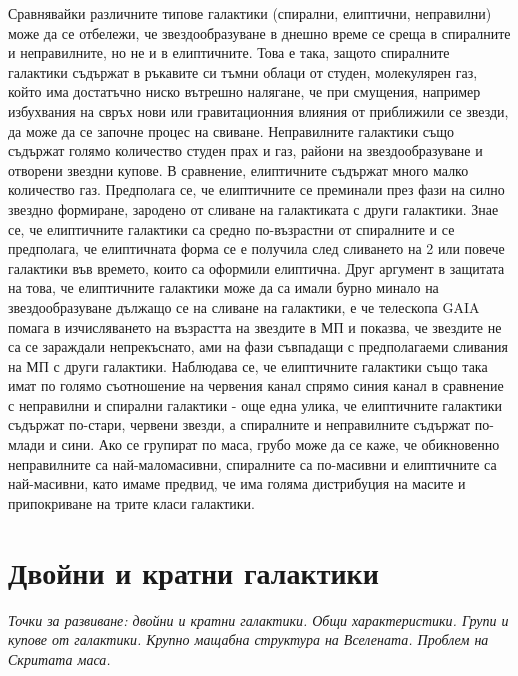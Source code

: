 \documentclass[a4paper,12pt]{article}
\begin{document}
Сравнявайки различните типове галактики (спирални, елиптични, неправилни) може да се отбележи, че звездообразуване в днешно време се среща в спиралните и неправилните, но не и в елиптичните. Това е така, защото спиралните галактики съдържат в ръкавите си тъмни облаци от студен, молекулярен газ, който има достатъчно ниско вътрешно налягане, че при смущения, например избухвания на свръх нови или гравитационния влияния от приближили се звезди, да може да се започне процес на свиване. Неправилните галактики също съдържат голямо количество студен прах и газ, райони на звездообразуване и отворени звездни купове. В сравнение, елиптичните съдържат много малко количество газ. Предполага се, че елиптичните се преминали през фази на силно звездно формиране, зародено от сливане на галактиката с други галактики. Знае се, че елиптичните галактики са средно по-възрастни от спиралните и се предполага, че елиптичната форма се е получила след сливането на 2 или повече галактики във времето, които са оформили елиптична. Друг аргумент в защитата на това, че елиптичните галактики може да са имали бурно минало на звездообразуване дължащо се на сливане на галактики, е че телескопа GAIA помага в изчисляването на възрастта на звездите в МП и показва, че звездите не са се зараждали непрекъснато, ами на фази съвпадащи с предполагаеми сливания на МП с други галактики. Наблюдава се, че елиптичните галактики също така имат по голямо съотношение на червения канал спрямо синия канал в сравнение с неправилни и спирални галактики - още една улика, че елиптичните галактики съдържат по-стари, червени звезди, а спиралните и неправилните съдържат по-млади и сини. Ако се групират по маса, грубо може да се каже, че обикновенно неправилните са най-маломасивни, спиралните са по-масивни и елиптичните са най-масивни, като имаме предвид, че има голяма дистрибуция на масите и припокриване на трите класи галактики.\\


\section{Двойни и кратни галактики}

\textit{Точки за развиване: двойни и кратни галактики. Общи характеристики. Групи и купове от галактики. Крупно мащабна структура на Вселената. Проблем на Скритата маса.}
\end{document}
